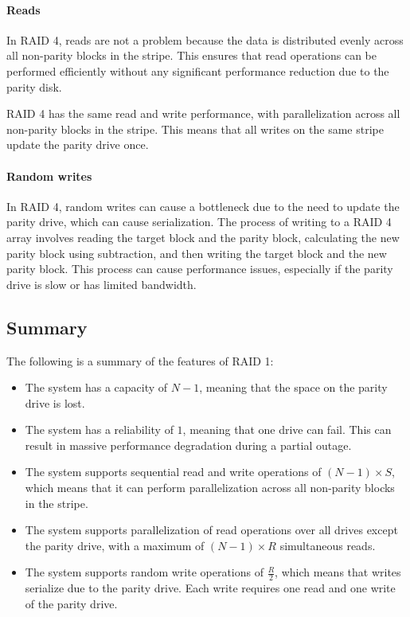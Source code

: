 \paragraph*{Reads}
In RAID 4, reads are not a problem because the data is distributed evenly across all non-parity blocks in the stripe. 
This ensures that read operations can be performed efficiently without any significant performance reduction due to the parity disk.

RAID 4 has the same read and write performance, with parallelization across all non-parity blocks in the stripe. 
This means that all writes on the same stripe update the parity drive once.

\paragraph*{Random writes}
In RAID 4, random writes can cause a bottleneck due to the need to update the parity drive, which can cause serialization. 
The process of writing to a RAID 4 array involves reading the target block and the parity block, calculating the new parity block using subtraction, and then writing the target block and the new parity block. 
This process can cause performance issues, especially if the parity drive is slow or has limited bandwidth.

\subsection{Summary}
The following is a summary of the features of RAID 1:
\begin{itemize}
    \item The system has a capacity of $N-1$, meaning that the space on the parity drive is lost. 
    \item The system has a reliability of $1$, meaning that one drive can fail. 
        This can result in massive performance degradation during a partial outage.
    \item The system supports sequential read and write operations of $(N-1)\times S$, which means that it can perform parallelization across all non-parity blocks in the stripe.
    \item The system supports parallelization of read operations over all drives except the parity drive, with a maximum of $(N-1)\times R$ simultaneous reads.
    \item The system supports random write operations of $\frac{R}{2}$, which means that writes serialize due to the parity drive. 
        Each write requires one read and one write of the parity drive.
\end{itemize}



